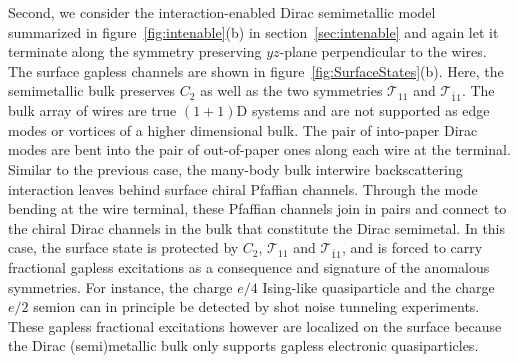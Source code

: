 Second, we consider the interaction-enabled Dirac semimetallic model summarized in figure~\ref{fig:intenable}(b) in section~\ref{sec:intenable} and again let it terminate along the symmetry preserving $yz$-plane perpendicular to the wires. The surface gapless channels are shown in figure~\ref{fig:SurfaceStates}(b). Here, the semimetallic bulk preserves $C_2$ as well as the two \AFTR symmetries $\mathcal{T}_{11}$ and $\mathcal{T}_{\bar{1}1}$. The bulk array of wires are true $(1+1)$D systems and are not supported as edge modes or vortices of a higher dimensional bulk. The pair of into-paper Dirac modes are bent into the pair of out-of-paper ones along each wire at the terminal. Similar to the previous case, the many-body bulk interwire backscattering interaction leaves behind surface chiral Pfaffian channels. Through the mode bending at the wire terminal, these Pfaffian channels join in pairs and connect to the chiral Dirac channels in the bulk that constitute the Dirac semimetal. In this case, the surface state is protected by $C_2$, $\mathcal{T}_{11}$ and $\mathcal{T}_{\bar{1}1}$, and is forced to carry fractional gapless excitations as a consequence and signature of the anomalous symmetries. For instance, the charge $e/4$ Ising-like quasiparticle and the charge $e/2$ semion can in principle be detected by shot noise tunneling experiments. These gapless fractional excitations however are localized on the surface because the Dirac (semi)metallic bulk only supports gapless electronic quasiparticles.


